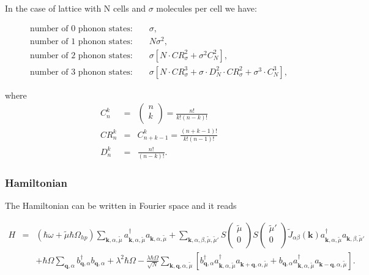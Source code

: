 \documentclass[pt12]{article}
\newcommand{\bfk}{\mathbf{k}}
\newcommand{\bfq}{\mathbf{q}}
\newcommand{\tmu}{\tilde{\mu}}
\begin{document}
In the case of lattice with N cells and $\sigma$ molecules per cell
we have:

\begin{eqnarray}
\textrm{number of 0 phonon states:  } && \sigma ,\\
\textrm{number of 1 phonon states:  } && N \sigma^2 ,\\
\textrm{number of 2 phonon states:  } && \sigma \left[ N\cdot CR^2_\sigma +\sigma^2 C_N^2 \right] ,\\
\textrm{number of 3 phonon states:  } && \sigma \left[ N\cdot
CR_\sigma^3 + \sigma\cdot D_N^2\cdot CR_\sigma^2 + \sigma^3\cdot
C_N^3 \right] ,
\end{eqnarray}

where
\begin{eqnarray}
C_n^k&=&\left(
        \begin{array}{c}
          n \\
          k \\
        \end{array}
      \right) = \frac{n!}{k!(n-k)!} \\
CR_n^k &=& C_{n+k-1}^k=\frac{(n+k-1)!}{k!(n-1)!} \\
D_n^k &=& \frac{n!}{(n-k)!}.
\end{eqnarray}


\subsubsection{Hamiltonian}
The Hamiltonian can be written in Fourier space and it reads

\begin{eqnarray}\label{H_FT}
H&=&\left(\hbar\omega+\tmu\hbar\Omega_{hp}\right)\sum_{\bfk,\alpha,\tmu}
a^\dagger_{\bfk,\alpha,\tmu}a_{\bfk,\alpha,\tmu}
+\sum_{\bfk,\alpha,\beta,\tmu,\tmu'} S\left(
                                \begin{array}{c}
                                    \tmu \\
                                    0 \\
                                  \end{array}
                                \right)
S\left(
                                \begin{array}{c}
                                    \tmu' \\
                                    0 \\
                                  \end{array}
                                \right)
\tilde{J}_{\alpha\beta}(\bfk)
a^\dagger_{\bfk,\alpha,\tmu}a_{\bfk,\beta,\tmu'}\\
\nonumber &&+\hbar\Omega\sum_{\bfq,\alpha}
b^\dagger_{\bfq,\alpha}b_{\bfq,\alpha}+\lambda^2\hbar\Omega
-\frac{\lambda\hbar\Omega}{\sqrt{N}}\sum_{\bfk,\bfq,\alpha,\tmu}
\left[
b^\dagger_{\bfq,\alpha}a^\dagger_{\bfk,\alpha,\tmu}a_{\bfk+\bfq,\alpha,\tmu}
+
b_{\bfq,\alpha}a^\dagger_{\bfk,\alpha,\tmu}a_{\bfk-\bfq,\alpha,\tmu}
\right].
\end{eqnarray}
\end{document}
